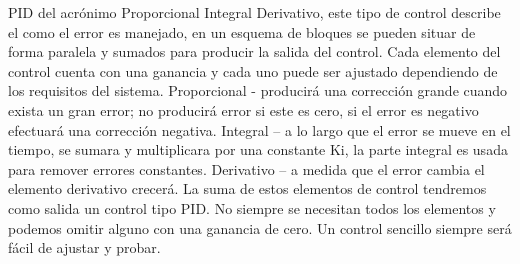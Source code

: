 \documentclass[
	12pt, %
]{fphw}
\begin{document}
PID del acrónimo Proporcional Integral Derivativo, este tipo de control describe el como el error es manejado, en un esquema de bloques se pueden situar de forma paralela y sumados para producir la salida del control. Cada elemento del control cuenta con una ganancia y cada uno puede ser ajustado dependiendo de los requisitos del sistema.
Proporcional - producirá una corrección grande cuando exista un gran error; no producirá error si este es cero, si el error es negativo efectuará una corrección negativa.
Integral – a lo largo que el error se mueve en el tiempo, se sumara y multiplicara por una constante Ki, la parte integral es usada para remover errores constantes.
Derivativo – a medida que el error cambia el elemento derivativo crecerá.
La suma de estos elementos de control tendremos como salida un control tipo PID. No siempre se necesitan todos los elementos y podemos omitir alguno con una ganancia de cero. Un control sencillo siempre será fácil de ajustar y probar.
\end{document}
